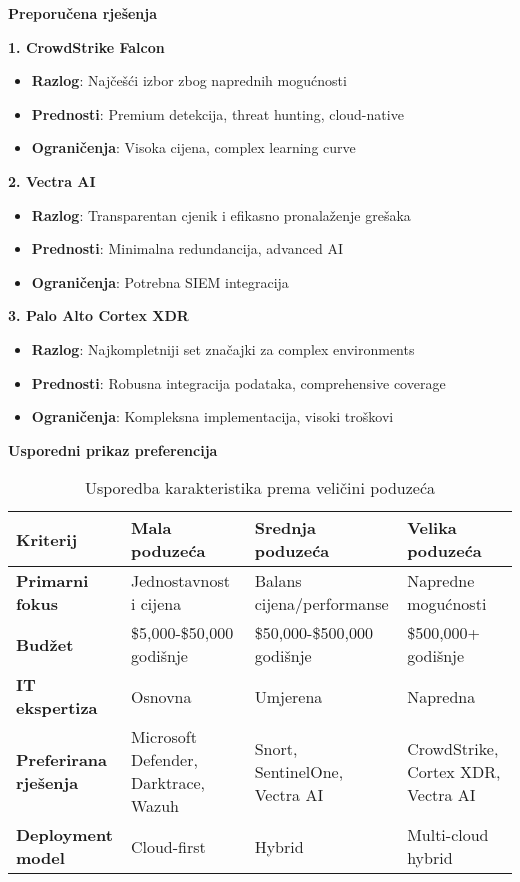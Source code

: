 \textbf{Preporučena rješenja}

\textbf{1. CrowdStrike Falcon}
\begin{itemize}
\item \textbf{Razlog}: Najčešći izbor zbog naprednih mogućnosti
\item \textbf{Prednosti}: Premium detekcija, threat hunting, cloud-native
\item \textbf{Ograničenja}: Visoka cijena, complex learning curve
\end{itemize}

\textbf{2. Vectra AI}
\begin{itemize}
\item \textbf{Razlog}: Transparentan cjenik i efikasno pronalaženje grešaka
\item \textbf{Prednosti}: Minimalna redundancija, advanced AI
\item \textbf{Ograničenja}: Potrebna SIEM integracija
\end{itemize}

\textbf{3. Palo Alto Cortex XDR}
\begin{itemize}
\item \textbf{Razlog}: Najkompletniji set značajki za complex environments
\item \textbf{Prednosti}: Robusna integracija podataka, comprehensive coverage
\item \textbf{Ograničenja}: Kompleksna implementacija, visoki troškovi
\end{itemize}

\textbf{Usporedni prikaz preferencija}

\begin{table}[h]
\centering
\begin{tabular}{|l|p{3.5cm}|p{3.5cm}|p{3.5cm}|}
\hline
\textbf{Kriterij} & \textbf{Mala poduzeća} & \textbf{Srednja poduzeća} & \textbf{Velika poduzeća} \\
\hline
\textbf{Primarni fokus} & Jednostavnost i cijena & Balans cijena/performanse & Napredne mogućnosti \\
\hline
\textbf{Budžet} & \$5,000-\$50,000 godišnje & \$50,000-\$500,000 godišnje & \$500,000+ godišnje \\
\hline
\textbf{IT ekspertiza} & Osnovna & Umjerena & Napredna \\
\hline
\textbf{Preferirana rješenja} & Microsoft Defender, Darktrace, Wazuh & Snort, SentinelOne, Vectra AI & CrowdStrike, Cortex XDR, Vectra AI \\
\hline
\textbf{Deployment model} & Cloud-first & Hybrid & Multi-cloud hybrid \\
\hline
\end{tabular}
\caption{Usporedba karakteristika prema veličini poduzeća}
\end{table}

